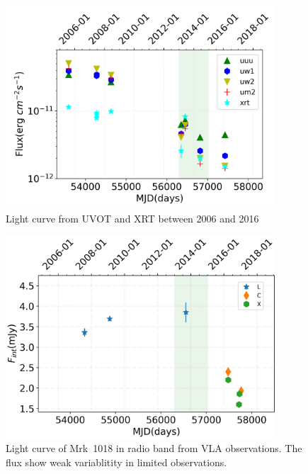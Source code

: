 \documentclass{aastex63}
\begin{document}
\begin{figure}
\centering
	\includegraphics[width=0.9\textwidth]{./pic/uvot-xray-date-lc-sim-left.png}
    \caption{Light curve from UVOT and XRT  between 2006 and 2016}
    \label{fig:uvot-xray-date-lc-all}
\end{figure}


\begin{figure}
\centering
	\includegraphics[width=0.9\textwidth]{./pic/radio-date-lc-2005.png}
    \caption{Light curve of Mrk~1018 in radio band from VLA observations. The flux show weak variablitity in limited observations. }
    \label{fig:radio-lc}
\end{figure}
\end{document}
